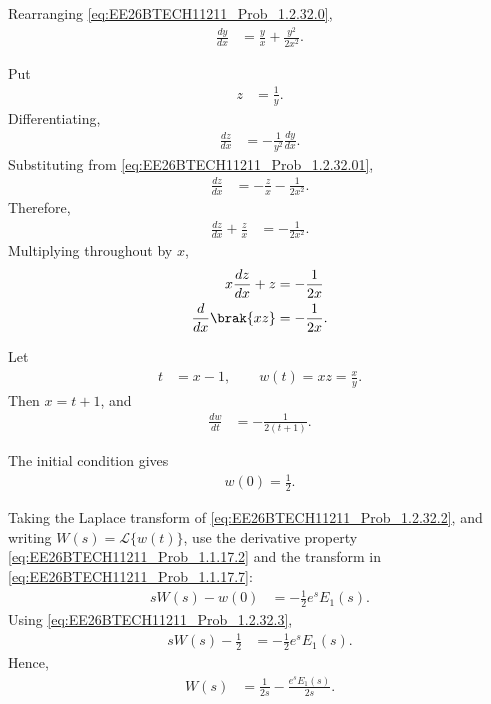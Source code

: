 \begin{enumerate}[label=\thesubsection.\arabic*, ref=\thesubsection.\theenumi]
\solution

Rearranging \eqref{eq:EE26BTECH11211_Prob_1.2.32.0},
\begin{align}
\frac{dy}{dx}&=\frac{y}{x}+\frac{y^2}{2x^2}.
\label{eq:EE26BTECH11211_Prob_1.2.32.01}
\end{align}

Put
\begin{align}
z&=\frac{1}{y}.
\end{align}
Differentiating,
\begin{align}
\frac{dz}{dx}&=-\frac{1}{y^2}\frac{dy}{dx}.
\end{align}
Substituting from \eqref{eq:EE26BTECH11211_Prob_1.2.32.01},
\begin{align}
\frac{dz}{dx}
&=-\frac{z}{x}-\frac{1}{2x^2}.
\end{align}
Therefore,
\begin{align}
\frac{dz}{dx}+\frac{z}{x}&=-\frac{1}{2x^2}.
\end{align}
Multiplying throughout by $x$,
\begin{align}
x\frac{dz}{dx}+z&=-\frac{1}{2x}\\
\frac{d}{dx}\brak{xz}&=-\frac{1}{2x}.
\end{align}

Let
\begin{align}
t&=x-1,\qquad w(t)=xz=\frac{x}{y}.
\label{eq:EE26BTECH11211_Prob_1.2.32.1}
\end{align}
Then $x=t+1$, and
\begin{align}
\frac{dw}{dt}&=-\frac{1}{2(t+1)}.
\label{eq:EE26BTECH11211_Prob_1.2.32.2}
\end{align}

The initial condition gives
\begin{align}
w(0)=\frac{1}{2}.
\label{eq:EE26BTECH11211_Prob_1.2.32.3}
\end{align}

Taking the Laplace transform of \eqref{eq:EE26BTECH11211_Prob_1.2.32.2}, and writing
$W(s)=\mathcal{L}\{w(t)\}$, use the derivative property
\eqref{eq:EE26BTECH11211_Prob_1.1.17.2} and the transform in
\eqref{eq:EE26BTECH11211_Prob_1.1.17.7}:
\begin{align}
sW(s)-w(0)&=-\frac{1}{2}e^sE_1(s).
\end{align}
Using \eqref{eq:EE26BTECH11211_Prob_1.2.32.3},
\begin{align}
sW(s)-\frac{1}{2}&=-\frac{1}{2}e^sE_1(s).
\end{align}
Hence,
\begin{align}
W(s)&=\frac{1}{2s}-\frac{e^sE_1(s)}{2s}.
\end{align}


\end{enumerate}
